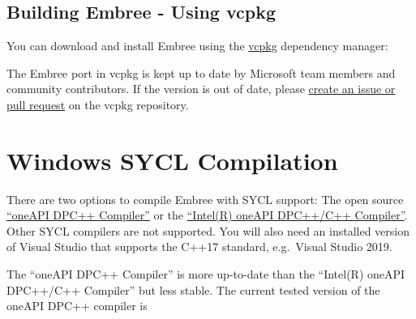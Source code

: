 \begin{Shaded}
\begin{Highlighting}[]
\OperatorTok{{-}{-}} \OperatorTok{{-}{-}}\OperatorTok{{-}{-}}\OperatorTok{{-}{-}} \OperatorTok{/}
\end{Highlighting}
\end{Shaded}

\subsection{Building Embree - Using
vcpkg}\label{building-embree---using-vcpkg}

You can download and install Embree using the
\href{https://github.com/Microsoft/vcpkg}{vcpkg} dependency manager:

\begin{Shaded}
\begin{Highlighting}[]
\OperatorTok{:}
\OperatorTok{{-}}
\end{Highlighting}
\end{Shaded}

The Embree port in vcpkg is kept up to date by Microsoft team members
and community contributors. If the version is out of date, please
\href{https://github.com/Microsoft/vcpkg}{create an issue or pull
request} on the vcpkg repository.

\section{Windows SYCL Compilation}\label{windows-sycl-compilation}

There are two options to compile Embree with SYCL support: The open
source \href{https://github.com/intel/llvm/}{``oneAPI DPC++ Compiler''}
or the
\href{https://www.intel.com/content/www/us/en/developer/articles/tool/oneapi-standalone-components.html\#dpcpp-cpp}{``Intel(R)
oneAPI DPC++/C++ Compiler''}. Other SYCL compilers are not supported.
You will also need an installed version of Visual Studio that supports
the C++17 standard, e.g.~Visual Studio 2019.

The ``oneAPI DPC++ Compiler'' is more up-to-date than the ``Intel(R)
oneAPI DPC++/C++ Compiler'' but less stable. The current tested version
of the oneAPI DPC++ compiler is

